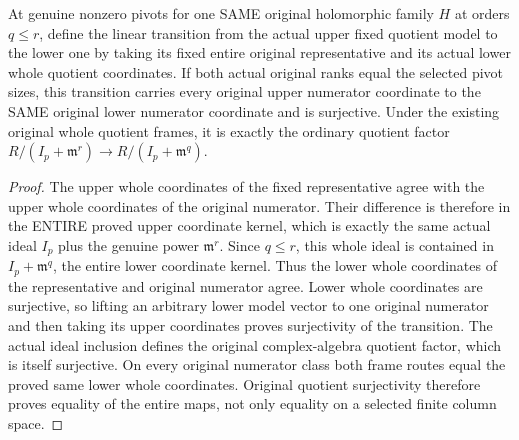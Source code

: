\begin{theorem}
\label{hir:actual-whole-quotient-frame-truncation}
At genuine nonzero pivots for one SAME original holomorphic family
$H$ at orders $q\le r$, define the linear transition from the actual
upper fixed quotient model to the lower one by taking its fixed
entire original representative and its actual lower whole quotient
coordinates. If both actual original ranks equal the selected pivot
sizes, this transition carries every original upper numerator
coordinate to the SAME original lower numerator coordinate and is
surjective. Under the existing original whole quotient frames, it
is exactly the ordinary quotient factor
$R/(I_p+\mathfrak m^r)\longrightarrow R/(I_p+\mathfrak m^q)$.
\leanok
\end{theorem}
\begin{proof}
The upper whole coordinates of the fixed representative agree with
the upper whole coordinates of the original numerator. Their
difference is therefore in the ENTIRE proved upper coordinate
kernel, which is exactly the same actual ideal $I_p$ plus the genuine
power $\mathfrak m^r$. Since $q\le r$, this whole ideal is contained
in $I_p+\mathfrak m^q$, the entire lower coordinate kernel. Thus the
lower whole coordinates of the representative and original numerator
agree. Lower whole coordinates are surjective, so lifting an arbitrary
lower model vector to one original numerator and then taking its
upper coordinates proves surjectivity of the transition. The actual
ideal inclusion defines the original complex-algebra quotient factor,
which is itself surjective. On every original numerator class both
frame routes equal the proved same lower whole coordinates. Original
quotient surjectivity therefore proves equality of the entire maps,
not only equality on a selected finite column space.
\end{proof}

